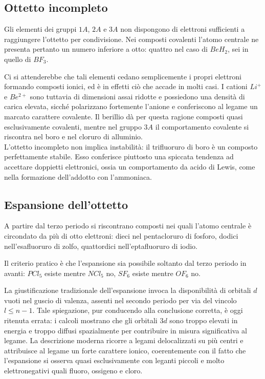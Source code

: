 \subsection{Ottetto incompleto}

Gli elementi dei gruppi $1A$, $2A$ e $3A$ non dispongono di elettroni sufficienti a raggiungere l'ottetto per condivisione. Nei composti covalenti l'atomo centrale ne presenta pertanto un numero inferiore a otto: quattro nel caso di $BeH_2$, sei in quello di $BF_3$.

Ci si attenderebbe che tali elementi cedano semplicemente i propri elettroni formando composti ionici, ed è in effetti ciò che accade in molti casi. I cationi $Li^+$ e $Be^{2+}$ sono tuttavia di dimensioni assai ridotte e possiedono una densità di carica elevata, sicché polarizzano fortemente l'anione e conferiscono al legame un marcato carattere covalente. Il berillio dà per questa ragione composti quasi esclusivamente covalenti, mentre nel gruppo $3A$ il comportamento covalente si riscontra nel boro e nel cloruro di alluminio.\\

L'ottetto incompleto non implica instabilità: il trifluoruro di boro è un composto perfettamente stabile. Esso conferisce piuttosto una spiccata tendenza ad accettare doppietti elettronici, ossia un comportamento da acido di Lewis, come nella formazione dell'addotto con l'ammoniaca.

\newpage

\subsection{Espansione dell'ottetto}

A partire dal terzo periodo si riscontrano composti nei quali l'atomo centrale è circondato da più di otto elettroni: dieci nel pentacloruro di fosforo, dodici nell'esafluoruro di zolfo, quattordici nell'eptafluoruro di iodio.

Il criterio pratico è che l'espansione sia possibile soltanto dal terzo periodo in avanti: $PCl_5$ esiste mentre $NCl_5$ no, $SF_6$ esiste mentre $OF_6$ no.

La giustificazione tradizionale dell'espansione invoca la disponibilità di orbitali $d$ vuoti nel guscio di valenza, assenti nel secondo periodo per via del vincolo $l \leq n-1$. Tale spiegazione, pur conducendo alla conclusione corretta, è oggi ritenuta errata: i calcoli mostrano che gli orbitali $3d$ sono troppo elevati in energia e troppo diffusi spazialmente per contribuire in misura significativa al legame. La descrizione moderna ricorre a legami delocalizzati su più centri e attribuisce al legame un forte carattere ionico, coerentemente con il fatto che l'espansione si osserva quasi esclusivamente con leganti piccoli e molto elettronegativi quali fluoro, ossigeno e cloro.

